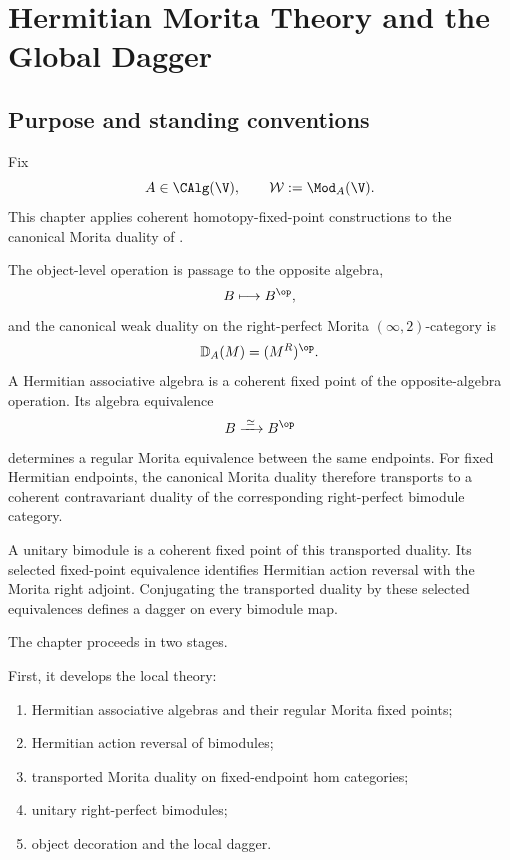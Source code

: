 \chapter{Hermitian Morita Theory and the Global Dagger}
\label{chap:hermitian-morita-global-dagger}

\section{Purpose and standing conventions}
\label{sec:hermitian-morita-purpose}

Fix
\[
    A\in\CAlg(\V),
    \qquad
    \mathcal W:=\Mod_A(\V).
\]
This chapter applies coherent homotopy-fixed-point constructions to the
canonical Morita duality of
.

The object-level operation is passage to the opposite algebra,
\[
    B\longmapsto B^{\op},
\]
and the canonical weak duality on the right-perfect Morita
$(\infty,2)$-category is
\[
    \mathbb D_A(M)
    =
    (M^R)^{\op}.
\]
A Hermitian associative algebra is a coherent fixed point of the
opposite-algebra operation. Its algebra equivalence
\[
    B
    \xrightarrow{\;\simeq\;}
    B^{\op}
\]
determines a regular Morita equivalence between the same endpoints.
For fixed Hermitian endpoints, the canonical Morita duality therefore
transports to a coherent contravariant duality of the corresponding
right-perfect bimodule category.

A unitary bimodule is a coherent fixed point of this transported
duality. Its selected fixed-point equivalence identifies Hermitian action
reversal with the Morita right adjoint. Conjugating the transported
duality by these selected equivalences defines a dagger on every
bimodule map.

The chapter proceeds in two stages.

First, it develops the local theory:
\begin{enumerate}[label=(\roman*)]
    \item Hermitian associative algebras and their regular Morita fixed
    points;

    \item Hermitian action reversal of bimodules;

    \item transported Morita duality on fixed-endpoint hom categories;

    \item unitary right-perfect bimodules;

    \item object decoration and the local dagger.
\end{enumerate}

